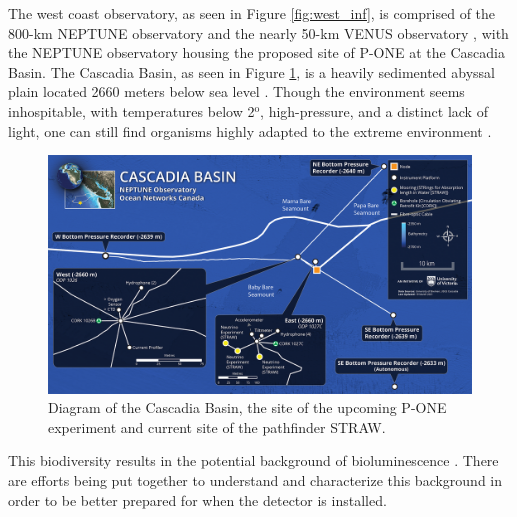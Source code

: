 The west coast observatory, as seen in Figure \ref{fig:west_inf}, is comprised of the 800-km NEPTUNE observatory and the nearly 50-km VENUS observatory \cite{onc}, with the NEPTUNE observatory housing the proposed site of P-ONE at the Cascadia Basin. The Cascadia Basin, as seen in Figure \ref{fig:casc}, is a heavily sedimented abyssal plain located 2660 meters below sea level \cite{onc}. Though the environment seems inhospitable, with temperatures below 2$^{\text{o}}$, high-pressure, and a distinct lack of light, one can still find organisms highly adapted to the extreme environment \cite{onc}. 

\begin{figure}
  \centering
  \includegraphics[width=.9\textwidth]{./Figures/cascadia_basin.png}
  \caption{Diagram of the Cascadia Basin, the site of the upcoming P-ONE experiment and current site of the pathfinder STRAW.}
  \label{fig:casc}
\end{figure}

This biodiversity results in the potential background of bioluminescence \cite{pone,onc}. There are efforts being put together to understand and characterize this background in order to be better prepared for when the detector is installed.



